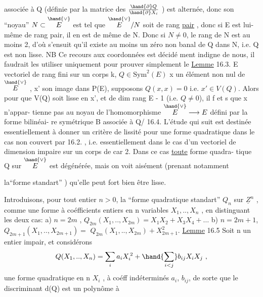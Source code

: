 
associée à Q (définie par la matrice des $\frac{\hand{\partial} Q}{\hand{\partial} X_i}$ ) est alternée, donc son
``noyau''  $N\subset\overset{\hand{\vee}}{E}$  est tel que  $\overset{\hand{\vee}}{E}/N$  soit de rang \uline{pair} , donc si E est lui-%
même de rang pair, il en est de même de N. Donc si $N\neq 0$, le rang de N
est au moins 2, d'où s'ensuit qu'il existe au moins un zéro non banal de
Q dans N, i.e. Q est non lisse.  NB Ce recours aux coordonnées est décidé
ment indigne de nous, il faudrait les utiliser uniquement pour prouver
simplement le
\uline{Lemme} 16.3. E vectoriel de rang fini sur un corps k, $Q\in \mathrm{Sym}^2(E)$ x un élément non nul de
$\overset{\hand{\vee}}{E}$ ,  x' son image dans P(E), supposons  $Q(x,x) = 0$ i.e.
$x'\in V(Q)$. Alors pour que  V(Q) soit lisse en x',
et de dim  rang E - 1   (i.e. $Q\neq 0$), il f et s  que x n'appar-%
tienne pas au noyau de l'homomorphisme $\overset{\hand{\vee}}{E}\longrightarrow E$ défini par la forme bilinéai-%
re symétrique B associée à Q/
16.4.  L'étude qui suit est destinée essentiellement à 
donner un critère de lissité pour une forme quadratique dans le cas non
couvert par 16.2. , i.e. essentiellement dans le cas d'un vectoriel de
dimension impaire sur un corps de car 2. Dans ce cas \uline{toute} forme quadra-%
tique  Q  sur $\overset{\hand{\vee}}{E}$ est dégénérée, mais on voit aisément (prenant notamment

la``forme standart'' ) qu'elle peut fort bien être lisse.

Introduisons, pour tout entier  $n>0$, la ``forme quadratique standart''
$Q_n$ sur $\underline{Z}^n$ , comme une forme à coéfficients entiers en n variables
$X_1,..,X_n$ ,  en distinguant les deux cas:
a)  $n = 2m$  ,  $Q_{2m}(X_1,..,X_{2m}) = X_1X_2 + X_3X_4 + \ldots$
b)  $n = 2m+1$,  $Q_{2m+1}(X_1,..,X_{2m+1}) =$ $Q_{2m}(X_1,..,X_{2m}) + X_{2m+1}^2$.
\uline{Lemme} 16.5  Soit n un entier impair, et considérons
\[ Q(X_{1},..,X_n) = \sum_i a_iX_i^{\,2} + \hand{\sum_{i<j}} b_{ij}X_iX_j \ , \]
une forme quadratique en n  $X_i$ , à coéff indéterminés
$a_i$, $b_{ij}$, de sorte que le discriminant  d(Q)  est un polynôme à


